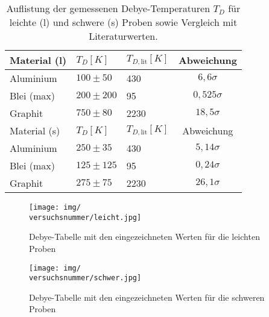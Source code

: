 \begin{table}[h!]
    \centering
    \begin{tabular}{l | l | l | c }
        \toprule
        Material (l) & $T_D [K]$ & $T_{D,\mathrm{lit}} [K]$ & Abweichung \\
        \hline
        Aluminium & $100 \pm 50$ & 430 & $6,6\sigma$ \\
        Blei (max) & $200 \pm 200$ & 95 & $0,525\sigma$ \\
        Graphit & $750 \pm 80$ & 2230 & $18,5\sigma$ \\
        \midrule
        Material (s) & $T_D [K]$ & $T_{D,\mathrm{lit}} [K]$ & Abweichung \\
        \hline
        Aluminium & $250 \pm 35$ & 430 & $5,14\sigma$ \\
        Blei (max) & $125 \pm 125$ & 95 & $0,24\sigma$ \\
        Graphit & $275 \pm 75$ & 2230 & $26,1\sigma$ \\
        \bottomrule
    \end{tabular}
    \caption{Auflistung der gemessenen Debye-Temperaturen $T_D$ für leichte (l) und schwere (s) Proben sowie Vergleich mit Literaturwerten.}     
    \label{tab:e_finn_will_nicht_mehr}
\end{table}

\onecolumn
\begin{figure}[t!]
    \raggedright
    \hspace*{-2.2cm}
    \texttt{[image: img/\\versuchsnummer/leicht.jpg]}
    \caption{Debye-Tabelle mit den eingezeichneten Werten für die leichten Proben}
    \label{img:graphisch_leicht}
\end{figure}

\begin{figure}[b!]
    \raggedright
    \hspace*{-2.2cm} 
    \texttt{[image: img/\\versuchsnummer/schwer.jpg]}
    \caption{Debye-Tabelle mit den eingezeichneten Werten für die schweren Proben}
    \label{img:graphisch_schwer}
\end{figure}
\twocolumn

